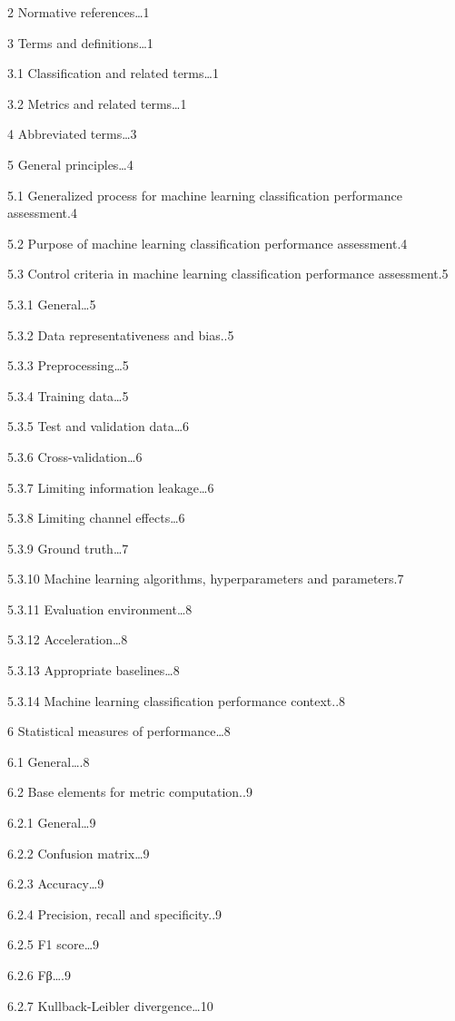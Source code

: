 \documentclass[
  letterpaper,
  DIV=11,
  numbers=noendperiod,
  oneside]{scrreprt}
\begin{document}
\begin{tcolorbox}
2 Normative references\ldots1

3 Terms and definitions\ldots1

3.1 Classification and related terms\ldots1

3.2 Metrics and related terms\ldots1

4 Abbreviated terms\ldots3

5 General principles\ldots4

5.1 Generalized process for machine learning classification performance
assessment.4

5.2 Purpose of machine learning classification performance assessment.4

5.3 Control criteria in machine learning classification performance
assessment.5

5.3.1 General\ldots5

5.3.2 Data representativeness and bias..5

5.3.3 Preprocessing\ldots5

5.3.4 Training data\ldots5

5.3.5 Test and validation data\ldots6

5.3.6 Cross-validation\ldots6

5.3.7 Limiting information leakage\ldots6

5.3.8 Limiting channel effects\ldots6

5.3.9 Ground truth\ldots7

5.3.10 Machine learning algorithms, hyperparameters and parameters.7

5.3.11 Evaluation environment\ldots8

5.3.12 Acceleration\ldots8

5.3.13 Appropriate baselines\ldots8

5.3.14 Machine learning classification performance context..8

6 Statistical measures of performance\ldots8

6.1 General\ldots.8

6.2 Base elements for metric computation..9

6.2.1 General\ldots9

6.2.2 Confusion matrix\ldots9

6.2.3 Accuracy\ldots9

6.2.4 Precision, recall and specificity..9

6.2.5 F1 score\ldots9

6.2.6 Fβ\ldots.9

6.2.7 Kullback-Leibler divergence\ldots10


\end{tcolorbox}
\end{document}
